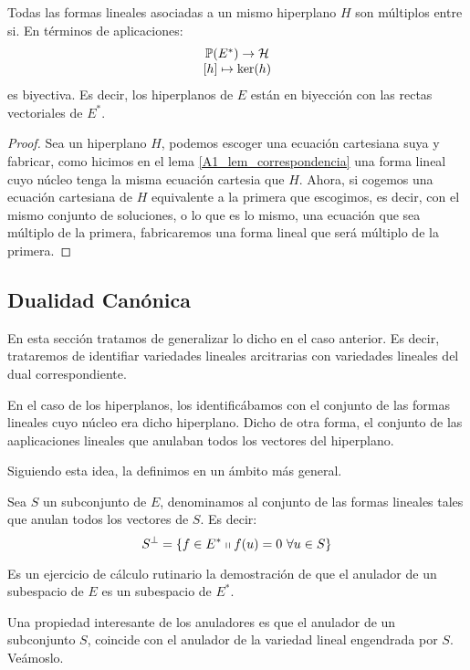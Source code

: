 \begin{lem}
	Todas las formas lineales asociadas a un mismo hiperplano $H$ son múltiplos entre si. En términos de aplicaciones:
	\[\begin{array}{c}
	\mathbb{P}(E^*)\to\mathcal{H}\\
	\left [ h \right ]\mapsto \ker(h)
	\end{array}
	\]
	es biyectiva. Es decir, los hiperplanos de $E$ están en biyección con las rectas vectoriales de $E^*$.
\end{lem}
\begin{proof}
	Sea un hiperplano $H$, podemos escoger una ecuación cartesiana suya y fabricar, como hicimos en el lema \ref{A1_lem_correspondencia} una forma lineal cuyo núcleo tenga la misma ecuación cartesia que $H$. Ahora, si cogemos una ecuación cartesiana de $H$ equivalente a la primera que escogimos, es decir, con el mismo conjunto de soluciones, o lo que es lo mismo, una ecuación que sea múltiplo de la primera, fabricaremos una forma lineal que será múltiplo de la primera.
\end{proof}
\subsection{Dualidad Canónica}
En esta sección tratamos de generalizar lo dicho en el caso anterior. Es decir, trataremos de identifiar variedades lineales arcitrarias con variedades lineales del dual correspondiente.

En el caso de los hiperplanos, los identificábamos con el conjunto de las formas lineales cuyo núcleo era dicho hiperplano. Dicho de otra forma, el conjunto de las aaplicaciones lineales que anulaban todos los vectores del hiperplano.

Siguiendo esta idea, la definimos en un ámbito más general.
\begin{defi}
	Sea $S$ un subconjunto de $E$, denominamos  al conjunto de las formas lineales tales que anulan todos los vectores de $S$. Es decir:
	\[S^{\perp}=\{f\in E^*\tq f(u)=0\ \forall u\in S\}\]
\end{defi}
Es un ejercicio de cálculo rutinario la demostración de que el anulador de un subespacio de $E$ es un subespacio de $E^*$.

Una propiedad interesante de los anuladores es que el anulador de un subconjunto $S$, coincide con el anulador de la variedad lineal engendrada por $S$. Veámoslo.

